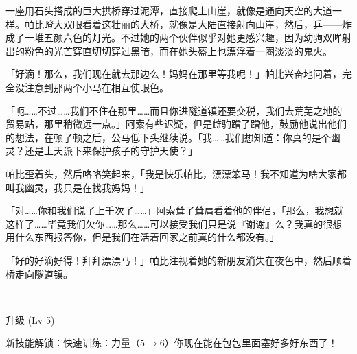 一座用石头搭成的巨大拱桥穿过泥潭，直接爬上山崖，就像是通向天空的大道一样。帕比瞪大双眼看着这壮丽的大桥，就像是大陆直接射向山崖，然后，乒——炸成了一堆五颜六色的灯光。不过她的两个伙伴似乎对她更感兴趣，因为幼驹双眸射出的粉色的光芒穿直切切穿过黑暗，而在她头盔上也漂浮着一圈淡淡的鬼火。

「好滴！那么，我们现在就去那边么！妈妈在那里等我呢！」帕比兴奋地问着，完全没注意到那两个小马在相互使眼色。

「呃……不过……我们不住在那里……而且你进隧道镇还要交税，我们去荒芜之地的贸易站，那里稍微远一点。」阿索有些迟疑，但是雌驹蹭了蹭他，鼓励他说出他们的想法，在顿了顿之后，公马低下头继续说。「我……我们想知道：你真的是个幽灵？还是上天派下来保护孩子的守护天使？」

帕比歪着头，然后咯咯笑起来，「我是快乐帕比，漂漂笨马！我不知道为啥大家都叫我幽灵，我只是在找我妈妈！」

「对……你和我们说了上千次了……」阿索耸了耸肩看着他的伴侣，「那么，我想就这样了……毕竟我们欠你……那么……可以接受我们只是说『谢谢』么？我真的很想用什么东西报答你，但是我们在活着回家之前真的什么都没有。」

「好的好滴好得！拜拜漂漂马！」帕比注视着她的新朋友消失在夜色中，然后顺着桥走向隧道镇。

~\vfill

\begin{note}
    升级 (Lv 5)

    新技能解锁：快速训练：力量（$5 \to 6$）你现在能在包包里面塞好多好东西了！
\end{note}



